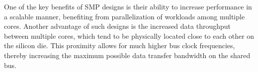 One of the key benefits of SMP designs is their ability to increase performance in a scalable manner, benefiting from parallelization of workloads among multiple cores. %
Another advantage of such designs is the increased data throughput between multiple cores, which tend to be physically located close to each other on the silicon die.
This proximity allows for much higher bus clock frequencies, thereby increasing the maximum possible data transfer bandwidth on the shared bus. %
